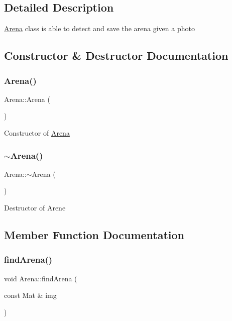 \subsection{Detailed Description}
\mbox{\hyperlink{class_arena}{Arena}} class is able to detect and save the arena given a photo 

\subsection{Constructor \& Destructor Documentation}
\mbox{\label{class_arena_a74f105bc709d4728fb07f1984abfd345}} 
\subsubsection{\texorpdfstring{Arena()}{Arena()}}
{\footnotesize\ttfamily Arena\+::\+Arena (\begin{DoxyParamCaption}{ }\end{DoxyParamCaption})}

Constructor of \mbox{\hyperlink{class_arena}{Arena}} \mbox{\label{class_arena_ae21b399e9e3f6b8ac4ecc44d7d1667fc}} 
\subsubsection{\texorpdfstring{$\sim$\+Arena()}{~Arena()}}
{\footnotesize\ttfamily Arena\+::$\sim$\+Arena (\begin{DoxyParamCaption}{ }\end{DoxyParamCaption})}

Destructor of Arene 

\subsection{Member Function Documentation}
\mbox{\label{class_arena_aa37acdf43108ab0da04b77bbf79c2f7d}} 
\subsubsection{\texorpdfstring{find\+Arena()}{findArena()}}
{\footnotesize\ttfamily void Arena\+::find\+Arena (\begin{DoxyParamCaption}\item[{const Mat \&}]{img }\end{DoxyParamCaption})}


